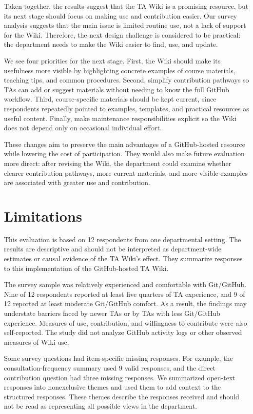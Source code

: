 \documentclass[11pt]{article}
\begin{document}
Taken together, the results suggest that the TA Wiki is a promising resource, but its next stage should focus on making use and contribution easier. Our survey analysis suggests that the main issue is limited routine use, not a lack of support for the Wiki. Therefore, the next design challenge is considered to be practical: the department needs to make the Wiki easier to find, use, and update.

We see four priorities for the next stage. First, the Wiki should make its usefulness more visible by highlighting concrete examples of course materials, teaching tips, and common procedures. Second, simplify contribution pathways so TAs can add or suggest materials without needing to know the full GitHub workflow. Third, course-specific materials should be kept current, since respondents repeatedly pointed to examples, templates, and practical resources as useful content. Finally, make maintenance responsibilities explicit so the Wiki does not depend only on occasional individual effort.

These changes aim to preserve the main advantages of a GitHub-hosted resource while lowering the cost of participation. They would also make future evaluation more direct: after revising the Wiki, the department could examine whether clearer contribution pathways, more current materials, and more visible examples are associated with greater use and contribution.
\section{Limitations}

This evaluation is based on 12 respondents from one departmental setting. The results are descriptive and should not be interpreted as department-wide estimates or causal evidence of the TA Wiki's effect. They summarize responses to this implementation of the GitHub-hosted TA Wiki.

The survey sample was relatively experienced and comfortable with Git/GitHub. Nine of 12 respondents reported at least five quarters of TA experience, and 9 of 12 reported at least moderate Git/GitHub comfort. As a result, the findings may understate barriers faced by newer TAs or by TAs with less Git/GitHub experience. Measures of use, contribution, and willingness to contribute were also self-reported. The study did not analyze GitHub activity logs or other observed measures of Wiki use.

Some survey questions had item-specific missing responses. For example, the consultation-frequency summary used 9 valid responses, and the direct contribution question had three missing responses. We summarized open-text responses into nonexclusive themes and used them to add context to the structured responses. These themes describe the responses received and should not be read as representing all possible views in the department.
\end{document}
